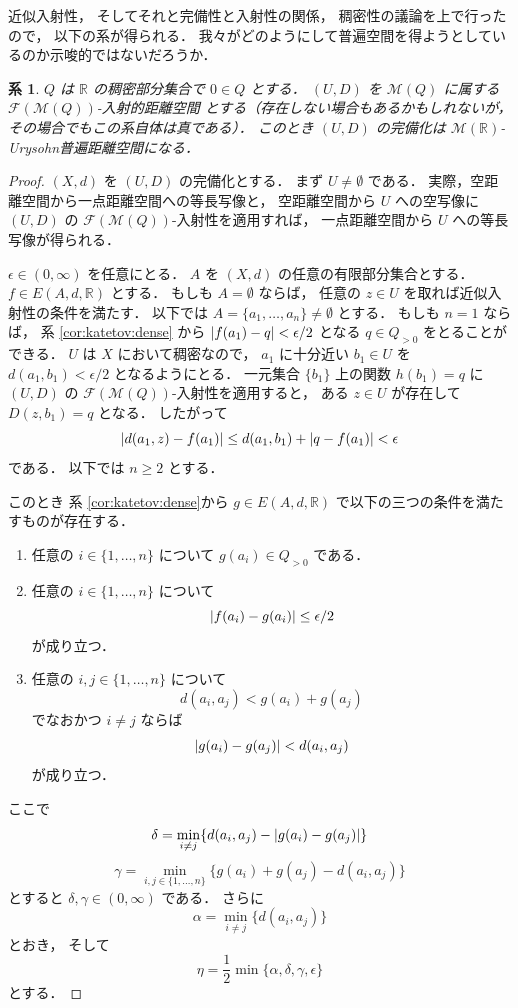 \documentclass[leqno, 12pt]{jsarticle}
\newtheorem{cor}[thm]{系}
\newcommand{\rr}{\mathbb{R}}
\DeclarePairedDelimiter{\abs}{\lvert}{\rvert}
\newcommand{\Met}[1]{\mathscr{M}(#1)}
\newcommand{\FinitePart}[1]{\mathscr{F}(#1)}
\newcommand{\FinMet}[1]{\FinitePart{\Met{#1}}}
\newcommand{\Espace}[3]{E(#1,#2,#3)}
\newcommand{\pospart}[1]{#1_{>0}}
\begin{document}
近似入射性，
そしてそれと完備性と入射性の関係，
稠密性の議論を上で行ったので，
以下の系が得られる．
我々がどのようにして普遍空間を得ようとしているのか示唆的ではないだろうか．

\begin{cor}\label{cor:katetov:compbecomesUrysohn}
$Q$
は
$\rr$
の稠密部分集合で
$0\in Q$
とする．
$(U, D)$
を
$\Met{Q}$
に属する
$\FinMet{Q}$-入射的距離空間
とする（存在しない場合もあるかもしれないが，%
その場合でもこの系自体は真である）．
このとき
$(U, D)$
の完備化は
$\Met{\rr}$-Urysohn普遍距離空間になる．
\end{cor}
\begin{proof}
$(X, d)$
を
$(U, D)$
の完備化とする．
まず
$U\neq\emptyset$
である．
実際，空距離空間から一点距離空間への等長写像と，
空距離空間から
$U$
への空写像に
$(U,D)$
の
$\FinMet{Q}$-入射性を適用すれば，
一点距離空間から
$U$
への等長写像が得られる．

$\epsilon\in (0, \infty)$
を任意にとる．
$A$
を
$(X, d)$
の任意の有限部分集合とする．
$f\in \Espace{A}{d}{\rr}$
とする．
もしも
$A=\emptyset$
ならば，
任意の
$z\in U$
を取れば近似入射性の条件を満たす．
以下では
$A=\{a_{1}, \dots, a_{n}\}\neq\emptyset$
とする．
もしも
$n=1$
ならば，
系
\ref{cor:katetov:dense}
から
$\abs{f(a_1)-q}<\epsilon/2$
となる
$q\in\pospart{Q}$
をとることができる．
$U$
は
$X$
において稠密なので，
$a_{1}$
に十分近い
$b_{1}\in U$
を
$d(a_{1}, b_{1})<\epsilon/2$
となるようにとる．
一元集合
$\{b_1\}$
上の関数
$h(b_1)=q$
に
$(U,D)$
の
$\FinMet{Q}$-入射性を適用すると，
ある
$z\in U$
が存在して
$D(z, b_{1})=q$
となる．
したがって
\[
\abs{d(a_1,z)-f(a_1)}
\le d(a_1,b_1)+\abs{q-f(a_1)}
<\epsilon
\]
である．
以下では
$n\ge2$
とする．


このとき
系
\ref{cor:katetov:dense}から
$g\in \Espace{A}{d}{\rr}$
で以下の三つの条件を満たすものが存在する．
\begin{enumerate}[label=\textup{(\arabic*)}]
\item
任意の
$i\in \{1, \dots, n\}$
について
$g(a_i)\in \pospart{Q}$
である．
\item
任意の
$i\in \{1, \dots, n\}$
について
\[
\abs{f(a_i)-g(a_i)}\le \epsilon/2
\]
が成り立つ．
\item
任意の
$i, j\in \{1, \dots, n\}$
について
\[
d(a_{i}, a_{j})<g(a_{i})+g(a_{j})
\]
でなおかつ
$i\neq j$%
ならば
\[
\abs{g(a_{i})-g(a_{j})}<d(a_{i}, a_{j})
\]
が成り立つ．

\end{enumerate}


ここで
\[
\delta=\min_{i\neq j}\{d(a_{i}, a_{j})-\abs{g(a_{i})-g(a_{j})}\}
\]
\[
\gamma=\min_{i, j\in \{1, \dots, n\}}\{
g(a_{i})+g(a_{j})-d(a_{i}, a_{j})
\}
\]
とすると
$\delta, \gamma\in (0, \infty)$%
である．
さらに
\[
\alpha=\min_{i\neq j}\{d(a_{i}, a_{j})\}
\]
とおき，
そして
\[
\eta=\frac{1}{2}\min\{\alpha, \delta, \gamma, \epsilon \}
\]
とする．




\end{proof}
\end{document}
